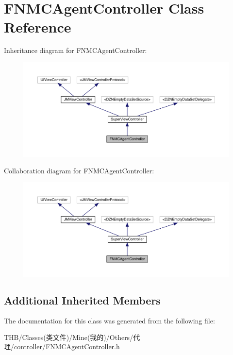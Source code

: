 \hypertarget{interface_f_n_m_c_agent_controller}{}\section{F\+N\+M\+C\+Agent\+Controller Class Reference}
\label{interface_f_n_m_c_agent_controller}


Inheritance diagram for F\+N\+M\+C\+Agent\+Controller\+:\nopagebreak
\begin{figure}[H]
\begin{center}
\leavevmode
\includegraphics[width=350pt]{interface_f_n_m_c_agent_controller__inherit__graph}
\end{center}
\end{figure}


Collaboration diagram for F\+N\+M\+C\+Agent\+Controller\+:\nopagebreak
\begin{figure}[H]
\begin{center}
\leavevmode
\includegraphics[width=350pt]{interface_f_n_m_c_agent_controller__coll__graph}
\end{center}
\end{figure}
\subsection*{Additional Inherited Members}


The documentation for this class was generated from the following file\+:\begin{DoxyCompactItemize}
\item 
T\+H\+B/\+Classes(类文件)/\+Mine(我的)/\+Others/代理/controller/F\+N\+M\+C\+Agent\+Controller.\+h\end{DoxyCompactItemize}
